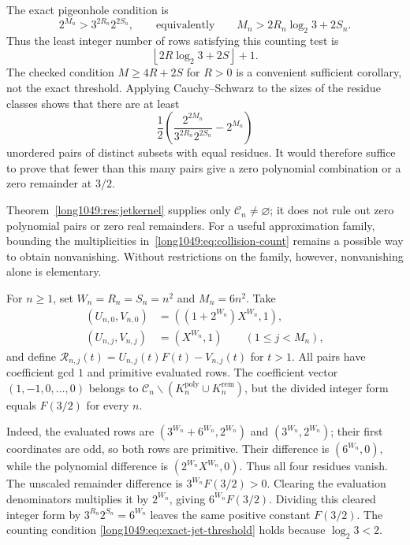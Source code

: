 \documentclass[11pt]{article}
\begin{document}
The exact pigeonhole condition is
\begin{equation}
 2^{M_n}>3^{2R_n}2^{2S_n},
 \qquad\text{equivalently}\qquad
 M_n>2R_n\log_2 3+2S_n.
\label{long1049:eq:exact-jet-threshold}
\end{equation}
Thus the least integer number of rows satisfying this counting test is
\[
 \left\lfloor2R\log_2 3+2S\right\rfloor+1.
\]
The checked condition $M\ge4R+2S$ for $R>0$ is a convenient sufficient
corollary, not the exact threshold. Applying Cauchy--Schwarz to the
sizes of the residue classes shows that there are at least
\begin{equation}
 \frac12\left(\frac{2^{2M_n}}{3^{2R_n}2^{2S_n}}-2^{M_n}\right)
\label{long1049:eq:collision-count}
\end{equation}
unordered pairs of distinct subsets with equal residues. It would
therefore suffice to prove that fewer than this many pairs give a zero
polynomial combination or a zero remainder at $3/2$.

Theorem~\ref{long1049:res:jetkernel} supplies only
$\mathcal C_n\ne\varnothing$; it does not rule out zero polynomial pairs
or zero real remainders. For a useful approximation family, bounding
the multiplicities in~\eqref{long1049:eq:collision-count} remains a
possible way to obtain nonvanishing. Without restrictions on the
family, however, nonvanishing alone is elementary.

\begin{example}\label{long1049:prob:escape}
For $n\ge1$, set $W_n=R_n=S_n=n^2$ and $M_n=6n^2$. Take
\[
\begin{aligned}
 (U_{n,0},V_{n,0})&=((1+2^{W_n})X^{W_n},1),\\
 (U_{n,j},V_{n,j})&=(X^{W_n},1)\qquad(1\le j<M_n),
\end{aligned}
\]
and define $\mathcal R_{n,j}(t)=U_{n,j}(t)F(t)-V_{n,j}(t)$ for $t>1$.
All pairs have coefficient gcd $1$ and primitive evaluated rows. The
coefficient vector $(1,-1,0,\ldots,0)$ belongs to
$\mathcal C_n\mathbin{\backslash}
(K_n^{\mathrm{poly}}\cup K_n^{\mathrm{rem}})$, but the divided
integer form equals $F(3/2)$ for every $n$.
\end{example}

Indeed, the evaluated rows are
$(3^{W_n}+6^{W_n},2^{W_n})$ and $(3^{W_n},2^{W_n})$; their first
coordinates are odd, so both rows are primitive. Their difference is
$(6^{W_n},0)$, while the polynomial difference is
$(2^{W_n}X^{W_n},0)$. Thus all four residues vanish. The unscaled remainder difference
is $3^{W_n}F(3/2)>0$. Clearing the evaluation denominators multiplies
it by $2^{W_n}$, giving $6^{W_n}F(3/2)$. Dividing this cleared
integer form by $3^{R_n}2^{S_n}=6^{W_n}$ leaves the same positive
constant $F(3/2)$. The counting condition
\eqref{long1049:eq:exact-jet-threshold} holds because $\log_2 3<2$.
\end{document}
